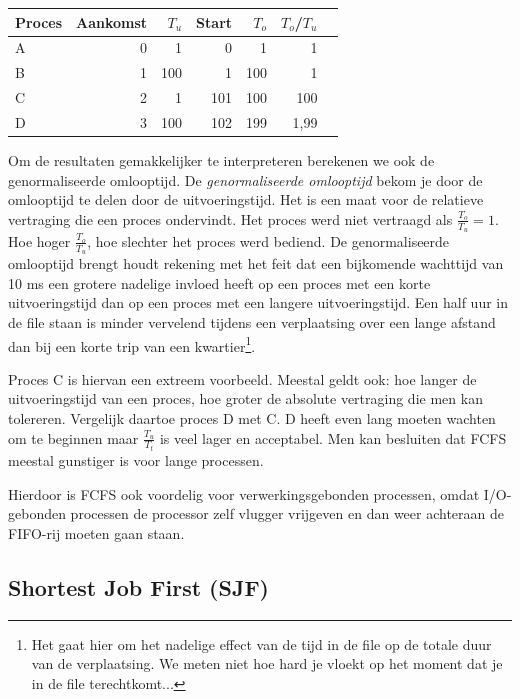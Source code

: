 \begin{center}
\begin{tabular}{|l|r|r|r|r|r|r|}
\hline
Proces & Aankomst & $T_u$ & Start & $T_o$ & ${T_o}$/${T_u}$ \\
\hline
A & 0 &   1 &   0 &   1 &    1 \\
B & 1 & 100 &   1 & 100 &    1 \\
C & 2 &   1 & 101 & 100 &  100 \\
D & 3 & 100 & 102 & 199 & 1,99 \\
\hline
\end{tabular}
\end{center}

Om de resultaten gemakkelijker te interpreteren berekenen we ook de
genormaliseerde omlooptijd. De \emph{genormaliseerde omlooptijd} bekom
je door de omlooptijd te delen door de uitvoeringstijd. Het is een maat
voor de relatieve vertraging die een proces ondervindt. Het proces
werd niet vertraagd als $\frac{T_o}{T_u} = 1$. Hoe hoger $\frac{T_o}{T_u}$, hoe
slechter het proces werd bediend. De genormaliseerde omlooptijd brengt houdt
rekening met het feit dat een bijkomende wachttijd van 10 ms een grotere
nadelige
invloed heeft op een proces met een korte uitvoeringstijd dan op een proces met
een langere uitvoeringstijd. Een half uur in de file staan is minder vervelend
tijdens een verplaatsing over een lange afstand dan bij een korte trip van een
kwartier\footnote{Het gaat hier om het nadelige effect van de tijd in de file
op de totale duur van de verplaatsing. We meten niet hoe hard je vloekt op het
moment dat je in de file terechtkomt...}.

Proces C is hiervan een extreem voorbeeld. Meestal geldt ook: hoe
langer de uitvoeringstijd van een proces, hoe groter de absolute
vertraging die men kan tolereren. Vergelijk daartoe proces D met C. D
heeft even lang moeten wachten om te beginnen maar
$\frac{T_u}{T_t}$ is veel lager en acceptabel. Men kan besluiten dat FCFS
meestal gunstiger is voor lange processen.

Hierdoor is FCFS ook voordelig voor verwerkingsgebonden
processen, omdat I/O-gebonden processen de processor zelf vlugger
vrijgeven en dan weer achteraan de FIFO-rij moeten gaan staan.

\subsection{Shortest Job First (SJF)}

